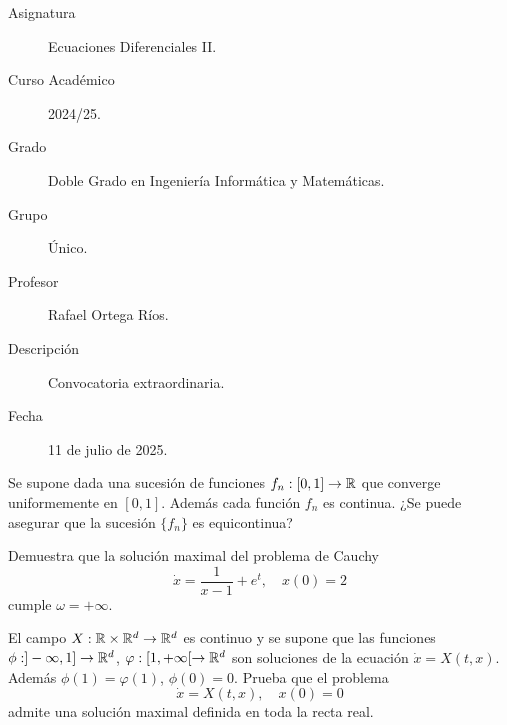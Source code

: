 \documentclass[12pt]{article}
\begin{document}

    
    

    \begin{description}
        \item[Asignatura] Ecuaciones Diferenciales II.
        \item[Curso Académico] 2024/25.
        \item[Grado] Doble Grado en Ingeniería Informática y Matemáticas.
        \item[Grupo] Único.
        \item[Profesor] Rafael Ortega Ríos.
        \item[Descripción] Convocatoria extraordinaria.
        \item[Fecha] 11 de julio de 2025.
    
    \end{description}
    \newpage


    
    \begin{ejercicio}
        Se supone dada una sucesión de funciones $f_n : [0, 1] \to \mathbb{R}$ que converge uniformemente en $[0, 1]$. Además cada función $f_n$ es continua. ¿Se puede asegurar que la sucesión $\{f_n\}$ es equicontinua?
    \end{ejercicio}

    \begin{ejercicio}
        Demuestra que la solución maximal del problema de Cauchy
        \[ \dot{x} = \frac{1}{x-1} + e^t, \quad x(0) = 2 \]
        cumple $\omega = +\infty$.
    \end{ejercicio}

    \begin{ejercicio}
        El campo $X : \mathbb{R} \times \mathbb{R}^d \to \mathbb{R}^d$ es continuo y se supone que las funciones $\phi : ]-\infty, 1] \to \mathbb{R}^d$, $\varphi : [1, +\infty[ \to \mathbb{R}^d$ son soluciones de la ecuación $\dot{x} = X(t, x)$. Además $\phi(1) = \varphi(1)$, $\phi(0) = 0$. Prueba que el problema
        \[ \dot{x} = X(t, x), \quad x(0) = 0 \]
        admite una solución maximal definida en toda la recta real.
    \end{ejercicio}
\end{document}
